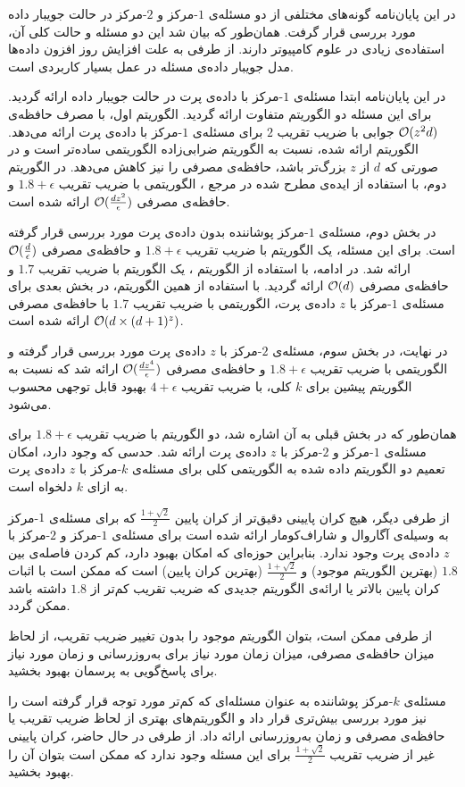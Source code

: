 

در این پایان‌نامه گونه‌های مختلفی از دو مسئله‌ی $1$-مرکز‌ و $2$-مرکز در حالت‌ جویبار داده  مورد بررسی قرار گرفت. همان‌طور که بیان شد این دو مسئله و حالت کلی آن، استفاده‌ی زیادی در علوم کامپیوتر دارند. از طرفی به علت افزایش روز افزون داده‌ها مدل‌ جویبار داده‌ی مسئله در عمل بسیار کاربردی است.

در این پایان‌نامه ابتدا مسئله‌ی $1$-مرکز با داده‌ی پرت در حالت جویبار داده ارائه گردید. برای این مسئله دو الگوریتم متفاوت ارائه گردید. الگوریتم اول، با مصرف حافظه‌ی $\mathcal{O}(z^2d)$ جوابی با ضریب تقریب $2$ برای مسئله‌ی $1$-مرکز با داده‌ی پرت ارائه می‌دهد. الگوریتم ارائه شده، نسبت به الگوریتم ضرابی‌زاده  الگوریتمی ساده‌تر است و در صورتی که $d$ از $z$ بزرگ‌تر باشد، حافظه‌ی مصرفی را نیز کاهش می‌دهد. در الگوریتم دوم، با استفاده از ایده‌ی مطرح شده در مرجع ، الگوریتمی با ضریب تقریب $1.8 + \epsilon$  و حافظه‌ی مصرفی $\mathcal{O}(\frac{dz^2}{\epsilon})$ ارائه شده است.

در بخش دوم، مسئله‌ی $1$-مرکز پوشاننده بدون داده‌ی پرت مورد بررسی قرار گرفته است. برای این مسئله، یک الگوریتم با ضریب تقریب $1.8 + \epsilon$ و حافظه‌ی مصرفی $\mathcal{O}(\frac{d}{\epsilon})$ ارائه شد. در ادامه، با استفاده از الگوریتم ، یک الگوریتم با ضریب تقریب $1.7$ و حافظه‌ی مصرفی $\mathcal{O}(d)$ ارائه گردید. با استفاده از همین الگوریتم، در بخش بعدی برای مسئله‌ی $1$-مرکز با $z$ داده‌ی پرت، الگوریتمی با ضریب تقریب $1.7$ با حافظه‌ی مصرفی $\mathcal{O}(d \times (d+1)^z)$ ارائه شده است.

در نهایت، در بخش سوم، مسئله‌ی $2$-مرکز با $z$ داده‌ی پرت مورد بررسی قرار گرفته و الگوریتمی با ضریب تقریب $1.8 + \epsilon$ و حافظه‌ی مصرفی $\mathcal{O}(\frac{dz^4}{\epsilon})$ ارائه شد که نسبت به الگوریتم پیشین برای $k$ کلی، با ضریب تقریب $4 + \epsilon$ بهبود قابل توجهی محسوب می‌شود.


همان‌طور که در بخش قبلی به آن اشاره شد، دو الگوریتم با ضریب تقریب $1.8 + \epsilon$ برای مسئله‌ی $1$-مرکز و $2$-مرکز با $z$ داده‌ی پرت ارائه شد.
حدسی که وجود دارد، امکان تعمیم دو الگوریتم داده شده به الگوریتمی کلی برای مسئله‌ی $k$-مرکز با $z$ داده‌ی پرت به ازای $k$ دلخواه است.

از طرفی دیگر، هیچ کران پایینی دقیق‌تر از کران پایین $\frac{1 + \sqrt{2}}{2}$ که برای مسئله‌ی $1$-مرکز به وسیله‌ی آگاروال و شاراف‌کومار ارائه شده است  برای مسئله‌ی $1$-مرکز و $2$-مرکز با $z$ داده‌ی پرت وجود ندارد.
بنابراین حوزه‌ای که امکان بهبود دارد، کم کردن فاصله‌ی بین $1.8$ (بهترین الگوریتم موجود) و $\frac{1 + \sqrt{2}}{2}$ (بهترین کران پایین) است که ممکن است با اثبات کران پایین بالا‌تر یا ارائه‌ی الگوریتم جدیدی که ضریب تقریب کم‌تر از $1.8$ داشته باشد ممکن گردد.

از طرفی ممکن است، بتوان الگوریتم موجود را بدون تغییر ضریب تقریب، از لحاظ میزان حافظه‌ی مصرفی، میزان زمان مورد نیاز برای به‌روزرسانی و زمان مورد نیاز برای پاسخ‌گویی به پرسمان بهبود بخشید.

مسئله‌ی $k$-مرکز پوشاننده به عنوان مسئله‌ای که کم‌تر مورد توجه قرار گرفته است را نیز مورد بررسی بیش‌تری قرار داد و الگوریتم‌های بهتری از لحاظ ضریب تقریب یا حافظه‌ی مصرفی و زمان به‌روزرسانی ارائه داد.
از طرفی در حال حاضر، کران پایینی غیر از ضریب تقریب $\frac{1 + \sqrt{2}}{2}$ برای این مسئله وجود ندارد که ممکن است بتوان آن را بهبود بخشید.
